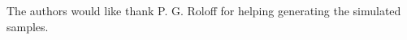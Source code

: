 \documentclass[a4paper,11pt]{article}
\begin{document}





\acknowledgments

The authors would like thank P. G. Roloff for helping generating the simulated samples. 


















\end{document}

